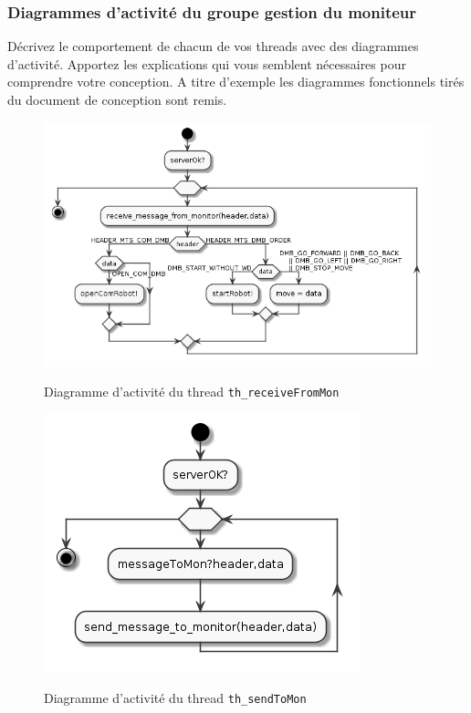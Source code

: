 \documentclass[11pt, a4paper]{paper}
\begin{document}
\subsubsection{Diagrammes d'activité  du groupe gestion du moniteur}
{\color{red}Décrivez le comportement de chacun de vos threads avec des diagrammes d'activité. Apportez les explications qui vous semblent nécessaires pour comprendre votre conception. A titre d'exemple les diagrammes fonctionnels tirés du document de conception sont remis.}

\begin{figure}[htbp]
\label{fig:act_communiquer}
\begin{center}
{\includegraphics[scale=.3]{./figures-pdf/th_receiveFromMon.png}}
{\caption{Diagramme d'activité du thread {\tt th\_receiveFromMon}}}
\end{center}
\end{figure}
\FloatBarrier

\begin{figure}[htbp]
\label{fig:act_envoyer}
\begin{center}
{\includegraphics[scale=.3]{./figures-pdf/th_sendToMon}}
{\caption{Diagramme d'activité du thread {\tt th\_sendToMon}}}
\end{center}
\end{figure}
\FloatBarrier
\end{document}
